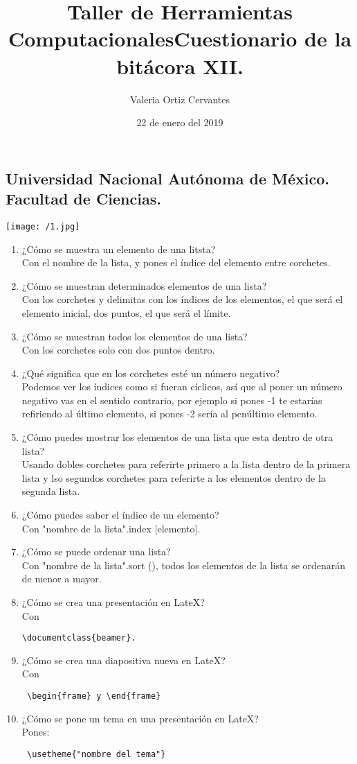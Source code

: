 \documentclass{article} %
\title{\Huge Taller de Herramientas Computacionales}
\author{\huge Valeria Ortiz Cervantes}
\date{\LARGE 22 de enero del 2019}
\begin{document}
\maketitle
\begin{center}
	\subsection*{\LARGE Universidad Nacional Autónoma de México.\\Facultad de Ciencias.\\}
	\texttt{[image: /1.jpg]}
\end{center}
\newpage
\title{\LARGE Cuestionario de la bitácora XII.}
\begin{enumerate}
	\item ¿Cómo se muestra un elemento de una litsta?\\Con el nombre de la lista, y pones el índice del elemento entre corchetes. 
	\item ¿Cómo se muestran determinados elementos de una lista?\\Con los corchetes y delimitas con los índices de los elementos, el que será el elemento inicial, dos puntos, el que será el límite. 
	\item ¿Cómo se muestran todos los elementos de una lista?\\Con los corchetes solo con dos puntos dentro. 
	\item ¿Qué significa que en los corchetes esté un número negativo?\\Podemos ver los índices como si fueran cíclicos, así que al poner un número negativo vas en el sentido contrario, por ejemplo si pones -1 te estarías refiriendo al último elemento, si pones -2 sería al penúltimo elemento.
	\item ¿Cómo puedes mostrar los elementos de una lista que esta dentro de otra lista?\\Usando dobles corchetes para referirte primero a la lista dentro de la primera lista y lso segundos corchetes para referirte a los elementos dentro de la segunda lista.
	\item ¿Cómo puedes saber el índice de un elemento?\\Con "nombre de la lista".index [elemento].
	\item ¿Cómo se puede ordenar una lista?\\ Con "nombre de la lista".sort (), todos los elementos de la lista se ordenarán de menor a mayor.
	\item ¿Cómo se crea una presentación en LateX?\\Con\begin{verbatim}\documentclass{beamer}. \end{verbatim}
	\item ¿Cómo se crea una diapositiva nueva en LateX?\\Con\begin{verbatim} \begin{frame} y \end{frame}\end{verbatim}
	\item ¿Cómo se pone un tema en una presentación en LateX?\\Pones: \begin{verbatim} \usetheme{"nombre del tema"}
	\end{verbatim}
\end{enumerate}
\end{document}
